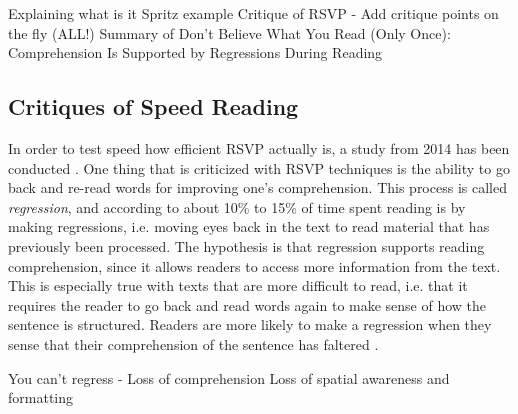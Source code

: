 Explaining what is it
Spritz example
Critique of RSVP - Add critique points on the fly (ALL!)
Summary of Don't Believe What You Read (Only Once): Comprehension Is Supported by Regressions During Reading

\subsection{Critiques of Speed Reading}
In order to test speed how efficient RSVP actually is, a study from 2014 has been conducted \cite{schotter_dont_2014}. One thing that is criticized with RSVP techniques is the ability to go back and re-read words for improving one's comprehension. This process is called \textit{regression}, and according to \cite{schotter_dont_2014} about 10\% to 15\% of time spent reading is by making regressions, i.e. moving eyes back in the text to read material that has previously been processed. The hypothesis is that regression supports reading comprehension, since it allows readers to access more information from the text. This is especially true with texts that are more difficult to read, i.e. that it requires the reader to go back and read words again to make sense of how the sentence is structured. Readers are more likely to make a regression when they sense that their comprehension of the sentence has faltered \cite{schotter_dont_2014}.

You can't regress - Loss of comprehension
Loss of spatial awareness and formatting
